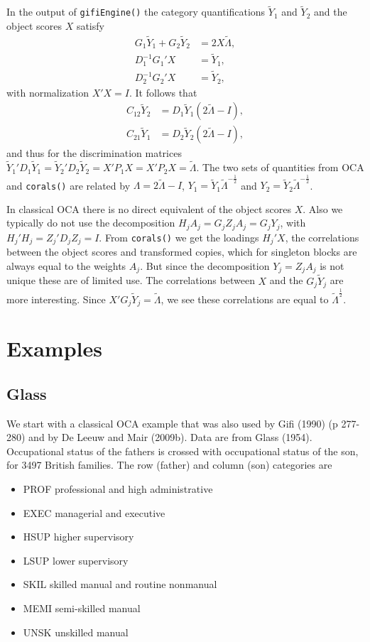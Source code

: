 \documentclass[
  12pt,
  letterpaper,
  DIV=11,
  numbers=noendperiod]{scrreprt}
\providecommand{\tightlist}{%
  \setlength{\itemsep}{0pt}\setlength{\parskip}{0pt}}
\begin{document}
In the output of \texttt{gifiEngine()} the category quantifications
\(\tilde Y_1\) and \(\tilde Y_2\) and the object scores \(X\) satisfy
\begin{align*}
G_1\tilde Y_1+G_2\tilde Y_2&=2X\tilde\Lambda,\\
D_1^{-1}G_1'X&=\tilde Y_1,\\
D_2^{-1}G_2'X&=\tilde Y_2,
\end{align*} with normalization \(X'X=I\). It follows that
\begin{align*}
C_{12}\tilde Y_2&=D_1\tilde Y_1(2\tilde\Lambda-I),\\
C_{21}\tilde Y_1&=D_2\tilde Y_2(2\tilde\Lambda-I),
\end{align*} and thus for the discrimination matrices
\(\tilde Y_1'D_1\tilde Y_1=\tilde Y_2'D_2\tilde Y_2=X'P_1X=X'P_2X=\tilde\Lambda\).
The two sets of quantities from OCA and \texttt{corals()} are related by
\(\Lambda=2\tilde\Lambda-I\), \(Y_1=\tilde Y_1\tilde\Lambda^{-\frac12}\)
and \(Y_2=\tilde Y_2\tilde\Lambda^{-\frac12}\).

In classical OCA there is no direct equivalent of the object scores
\(X\). Also we typically do not use the decomposition
\(H_jA_j=G_jZ_jA_j=G_jY_j\), with \(H_j'H_j=Z_j'D_jZ_j=I\). From
\texttt{corals()} we get the loadings \(H_j'X\), the correlations
between the object scores and transformed copies, which for singleton
blocks are always equal to the weights \(A_j\). But since the
decomposition \(Y_j=Z_jA_j\) is not unique these are of limited use. The
correlations between \(X\) and the \(G_j\tilde Y_j\) are more
interesting. Since \(X'G_j\tilde Y_j=\tilde\Lambda\), we see these
correlations are equal to \(\tilde\Lambda^\frac12\).

\section{Examples}\label{examples-1}

\subsection{Glass}\label{glass}

We start with a classical OCA example that was also used by Gifi (1990)
(p 277-280) and by De Leeuw and Mair (2009b). Data are from Glass
(1954). Occupational status of the fathers is crossed with occupational
status of the son, for 3497 British families. The row (father) and
column (son) categories are

\begin{itemize}
\tightlist
\item
  PROF professional and high administrative
\item
  EXEC managerial and executive
\item
  HSUP higher supervisory
\item
  LSUP lower supervisory
\item
  SKIL skilled manual and routine nonmanual
\item
  MEMI semi-skilled manual
\item
  UNSK unskilled manual
\end{itemize}
\end{document}
